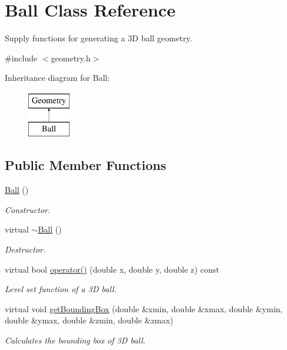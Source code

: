 \hypertarget{classBall}{\section{Ball Class Reference}
\label{classBall}
}


Supply functions for generating a 3\-D ball geometry.  




{\ttfamily \#include $<$geometry.\-h$>$}

Inheritance diagram for Ball\-:\begin{figure}[H]
\begin{center}
\leavevmode
\includegraphics[height=2.000000cm]{classBall}
\end{center}
\end{figure}
\subsection*{Public Member Functions}
\begin{DoxyCompactItemize}
\item 
\hypertarget{classBall_a86a144d3dad6c953e422e32435923bbb}{\hyperlink{classBall_a86a144d3dad6c953e422e32435923bbb}{Ball} ()}\label{classBall_a86a144d3dad6c953e422e32435923bbb}

\begin{DoxyCompactList}\small\item\em Constructor. \end{DoxyCompactList}\item 
\hypertarget{classBall_a78aa1f06b39fc9f81df82bef399c475c}{virtual \hyperlink{classBall_a78aa1f06b39fc9f81df82bef399c475c}{$\sim$\-Ball} ()}\label{classBall_a78aa1f06b39fc9f81df82bef399c475c}

\begin{DoxyCompactList}\small\item\em Destructor. \end{DoxyCompactList}\item 
virtual bool \hyperlink{classBall_a3768880c8851caa9125b967c1083043c}{operator()} (double x, double y, double z) const 
\begin{DoxyCompactList}\small\item\em Level set function of a 3\-D ball. \end{DoxyCompactList}\item 
virtual void \hyperlink{classBall_ad9768e543e28ba727488f51eb80dc35a}{get\-Bounding\-Box} (double \&xmin, double \&xmax, double \&ymin, double \&ymax, double \&zmin, double \&zmax)
\begin{DoxyCompactList}\small\item\em Calculates the bounding box of 3\-D ball. \end{DoxyCompactList}\end{DoxyCompactItemize}


